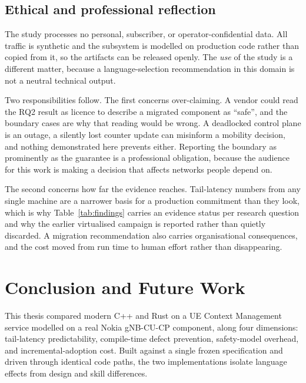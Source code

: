 \documentclass[english,oneside,a4paper,censored,csm,software-track-2020]{HYthesisML}
\begin{document}
\section{Ethical and professional reflection}
The study processes no personal, subscriber, or operator-confidential data. All traffic is
synthetic and the subsystem is modelled on production code rather than copied from it, so the
artifacts can be released openly. The \emph{use} of the study is a different matter, because a
language-selection recommendation in this domain is not a neutral technical output.

Two responsibilities follow. The first concerns over-claiming. A vendor could read
the RQ2 result as licence to describe a migrated component as ``safe'', and the boundary cases
are why that reading would be wrong. A deadlocked control plane is an outage, a
silently lost counter update can misinform a mobility decision, and nothing demonstrated here
prevents either. Reporting the boundary as prominently as the guarantee is a
professional obligation, because the audience for this work is making a decision that affects
networks people depend on.

The second concerns how far the evidence reaches. Tail-latency numbers from any single machine
are a narrower basis for a production commitment than they look, which is why
Table~\ref{tab:findings} carries an evidence status per research question and why the earlier
virtualised campaign is reported rather than quietly discarded. A migration recommendation also
carries organisational consequences, and the cost moved from run time to human effort rather
than disappearing.

\chapter{Conclusion and Future Work\label{chapter:conclusions}}

This thesis compared modern C++ and Rust on a UE Context Management service modelled on a real
Nokia gNB-CU-CP component, along four dimensions: tail-latency predictability, compile-time
defect prevention, safety-model overhead, and incremental-adoption cost. Built against a single
frozen specification and driven through identical code paths, the two implementations isolate
language effects from design and skill differences.
\end{document}
